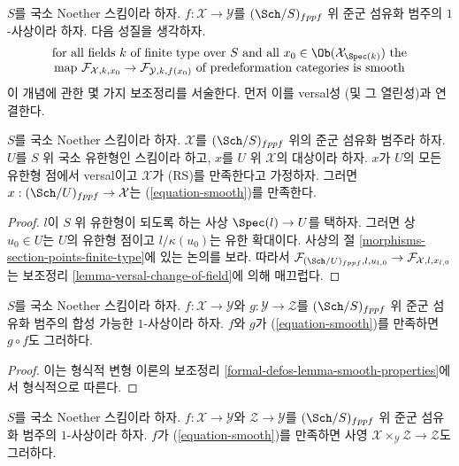 \noindent
$S$를 국소 Noether 스킴이라 하자.
$f : \mathcal{X} \to \mathcal{Y}$를 $(\Sch/S)_{fppf}$ 위
준군 섬유화 범주의 $1$-사상이라 하자. 다음 성질을 생각하자.
\begin{equation}
\label{equation-smooth}
\begin{matrix}
\text{for all fields }k\text{ of finite type over }S
\text{ and all }x_0 \in \Ob(\mathcal{X}_{\Spec(k)})\text{ the}\\
\text{map }
\mathcal{F}_{\mathcal{X}, k, x_0} \to \mathcal{F}_{\mathcal{Y}, k, f(x_0)}
\text{ of predeformation categories is smooth}
\end{matrix}
\end{equation}
이 개념에 관한 몇 가지 보조정리를 서술한다. 먼저 이를 versal성
(및 그 열린성)과 연결한다.

\begin{lemma}
\label{lemma-versal-smooth}
$S$를 국소 Noether 스킴이라 하자. $\mathcal{X}$를
$(\Sch/S)_{fppf}$ 위의 준군 섬유화 범주라 하자.
$U$를 $S$ 위 국소 유한형인 스킴이라 하고, $x$를 $U$ 위
$\mathcal{X}$의 대상이라 하자. $x$가 $U$의 모든 유한형 점에서
versal이고 $\mathcal{X}$가 (RS)를 만족한다고 가정하자. 그러면
$x : (\Sch/U)_{fppf} \to \mathcal{X}$는 (\ref{equation-smooth})를 만족한다.
\end{lemma}

\begin{proof}
$l$이 $S$ 위 유한형이 되도록 하는 사상 $\Spec(l) \to U$를 택하자.
그러면 상 $u_0 \in U$는 $U$의 유한형 점이고
$l/\kappa(u_0)$는 유한 확대이다. 사상의
절 \ref{morphisms-section-points-finite-type}에 있는 논의를 보라.
따라서
$\mathcal{F}_{(\Sch/U)_{fppf}, l, u_{l, 0}} \to
\mathcal{F}_{\mathcal{X}, l, x_{l, 0}}$
는 보조정리 \ref{lemma-versal-change-of-field}에 의해 매끄럽다.
\end{proof}

\begin{lemma}
\label{lemma-composition-smooth}
$S$를 국소 Noether 스킴이라 하자.
$f : \mathcal{X} \to \mathcal{Y}$와 $g : \mathcal{Y} \to \mathcal{Z}$를
$(\Sch/S)_{fppf}$ 위 준군 섬유화 범주의 합성 가능한 $1$-사상이라 하자.
$f$와 $g$가 (\ref{equation-smooth})를 만족하면 $g \circ f$도 그러하다.
\end{lemma}

\begin{proof}
이는 형식적 변형 이론의 보조정리
\ref{formal-defos-lemma-smooth-properties}에서 형식적으로 따른다.
\end{proof}

\begin{lemma}
\label{lemma-base-change-smooth}
$S$를 국소 Noether 스킴이라 하자.
$f : \mathcal{X} \to \mathcal{Y}$와 $\mathcal{Z} \to \mathcal{Y}$를
$(\Sch/S)_{fppf}$ 위 준군 섬유화 범주의 $1$-사상이라 하자.
$f$가 (\ref{equation-smooth})를 만족하면 사영
$\mathcal{X} \times_\mathcal{Y} \mathcal{Z} \to \mathcal{Z}$도 그러하다.
\end{lemma}

